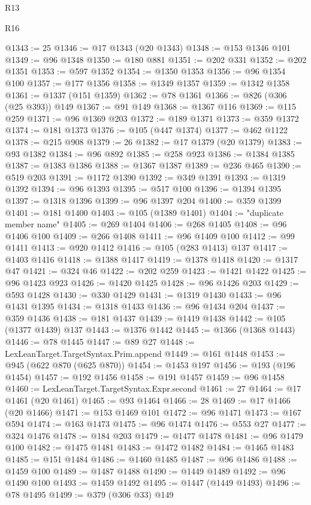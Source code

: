 \begin{lexlean}{R13}
\begin{lexlean}{R16}
\begin{coremodule}
{{{{{{{{{{{{{{{{{{{{{{{{{{{{{{{{{{{{{{{{{{{{{{{{{{{{{{{{{{{{{{{{{{{{{{{{{{{{{{{{{{{{{{{{{{{{{{{{{{{{{{{{{{{{{{{{{@1343 := 25
@1346 := @17 @1343 (@20 @1343)
@1348 := @153 @1346 @101
@1349 := @96 @1348
@1350 := @180 @881
@1351 := @202 @331
@1352 := @202 @1351
@1353 := @597 @1352
@1354 := @1350 @1353
@1356 := @96 @1354 @100
@1357 := @177 @1356
@1358 := @1349 @1357
@1359 := @1342 @1358
@1361 := @1337 (@151 @1359)
@1362 := @78 @1361
@1366 := @826 (@306 (@25 @393)) @149
@1367 := @91 @149
@1368 := @1367 @116
@1369 := @115 @259
@1371 := @96 @1369 @203
@1372 := @189 @1371
@1373 := @359 @1372
@1374 := @181 @1373
@1376 := @105 (@447 @1374)
@1377 := @462 @1122
@1378 := @215 @908
@1379 := 26
@1382 := @17 @1379 (@20 @1379)
@1383 := @93 @1382
@1384 := @96 @892
@1385 := @258 @923
@1386 := @1384 @1385
@1387 := @1383 @1386
@1388 := @1367 @1387
@1389 := @236 @465
@1390 := @519 @203
@1391 := @1172 @1390
@1392 := @349 @1391
@1393 := @1319 @1392
@1394 := @96 @1393
@1395 := @517 @100
@1396 := @1394 @1395
@1397 := @1318 @1396
@1399 := @96 @1397 @204
@1400 := @359 @1399
@1401 := @181 @1400
@1403 := @105 (@1389 @1401)
@1404 := "duplicate member name"
@1405 := @269 @1404
@1406 := @268 @1405
@1408 := @96 @1406 @100
@1409 := @266 @1408
@1411 := @96 @1409 @100
@1412 := @99 @1411
@1413 := @920 @1412
@1416 := @105 (@283 @1413) @137
@1417 := @1403 @1416
@1418 := @1388 @1417
@1419 := @1378 @1418
@1420 := @1317 @47
@1421 := @324 @46
@1422 := @202 @259
@1423 := @1421 @1422
@1425 := @96 @1423 @923
@1426 := @1420 @1425
@1428 := @96 @1426 @203
@1429 := @593 @1428
@1430 := @330 @1429
@1431 := @1319 @1430
@1433 := @96 @1431 @1395
@1434 := @1318 @1433
@1436 := @96 @1434 @204
@1437 := @359 @1436
@1438 := @181 @1437
@1439 := @1419 @1438
@1442 := @105 (@1377 @1439) @137
@1443 := @1376 @1442
@1445 := @1366 (@1368 @1443)
@1446 := @78 @1445
@1447 := @89 @27
@1448 := LexLeanTarget.TargetSyntax.Prim.append
@1449 := @161 @1448
@1453 := @945 (@622 @870 (@625 @870))
@1454 := @1453 @197
@1456 := @193 (@196 @1454)
@1457 := @192 @1456
@1458 := @191 @1457
@1459 := @96 @1458
@1460 := LexLeanTarget.TargetSyntax.Expr.second
@1461 := 27
@1464 := @17 @1461 (@20 @1461)
@1465 := @93 @1464
@1466 := 28
@1469 := @17 @1466 (@20 @1466)
@1471 := @153 @1469 @101
@1472 := @96 @1471
@1473 := @167 @594
@1474 := @163 @1473
@1475 := @96 @1474
@1476 := @553 @27
@1477 := @324 @1476
@1478 := @184 @203
@1479 := @1477 @1478
@1481 := @96 @1479 @100
@1482 := @1475 @1481
@1483 := @1472 @1482
@1484 := @1465 @1483
@1485 := @151 @1484
@1486 := @1460 @1485
@1487 := @96 @1486
@1488 := @1459 @100
@1489 := @1487 @1488
@1490 := @1449 @1489
@1492 := @96 @1490 @100
@1493 := @1459 @1492
@1495 := @1447 (@1449 @1493)
@1496 := @78 @1495
@1499 := @379 (@306 @33) @149
}}}}}}}}}}}}}}}}}}}}}}}}}}}}}}}}}}}}}}}}}}}}}}}}}}}}}}}}}}}}}}}}}}}}}}}}}}}}}}}}}}}}}}}}}}}}}}}}}}}}}}}}}}}}}}}}}
\end{coremodule}
\end{lexlean}
\end{lexlean}
